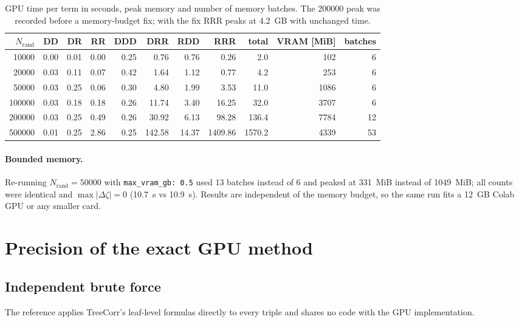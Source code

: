 \documentclass[11pt,a4paper]{article}
\begin{document}
\begin{table}[htbp]
\centering
\small
\caption{GPU time per term in seconds, peak memory and number of memory batches. The \num{200000} peak was recorded before a memory-budget fix; with the fix RRR peaks at \SI{4.2}{GB} with unchanged time.}
\label{tab:terms}
\begin{tabular}{rrrrrrrrrrr}
\toprule
$N_\mathrm{rand}$ & DD & DR & RR & DDD & DRR & RDD & RRR & total & VRAM [MiB] & batches \\
\midrule
\num{10000} & \num{0.00} & \num{0.01} & \num{0.00} & \num{0.25} & \num{0.76} & \num{0.76} & \num{0.26} & \num{2.0} & \num{102} & 6 \\
\num{20000} & \num{0.03} & \num{0.11} & \num{0.07} & \num{0.42} & \num{1.64} & \num{1.12} & \num{0.77} & \num{4.2} & \num{253} & 6 \\
\num{50000} & \num{0.03} & \num{0.25} & \num{0.06} & \num{0.30} & \num{4.80} & \num{1.99} & \num{3.53} & \num{11.0} & \num{1086} & 6 \\
\num{100000} & \num{0.03} & \num{0.18} & \num{0.18} & \num{0.26} & \num{11.74} & \num{3.40} & \num{16.25} & \num{32.0} & \num{3707} & 6 \\
\num{200000} & \num{0.03} & \num{0.25} & \num{0.49} & \num{0.26} & \num{30.92} & \num{6.13} & \num{98.28} & \num{136.4} & \num{7784} & 12 \\
\num{500000} & \num{0.01} & \num{0.25} & \num{2.86} & \num{0.25} & \num{142.58} & \num{14.37} & \num{1409.86} & \num{1570.2} & \num{4339} & 53 \\
\bottomrule
\end{tabular}
\end{table}

\paragraph{Bounded memory.} Re-running $N_\mathrm{rand}=\num{50000}$ with \texttt{max\_vram\_gb: 0.5} used 13 batches instead of 6 and peaked at \SI{331}{MiB} instead of \SI{1049}{MiB}; all counts were identical and $\max|\Delta\zeta|=\num{0}$ (\SI{10.7}{s} vs \SI{10.9}{s}). Results are independent of the memory budget, so the same run fits a \SI{12}{GB} Colab GPU or any smaller card.

\section{Precision of the exact GPU method}
\subsection{Independent brute force}
The reference applies TreeCorr's leaf-level formulas directly to every triple and shares no code
with the GPU implementation.
\end{document}
